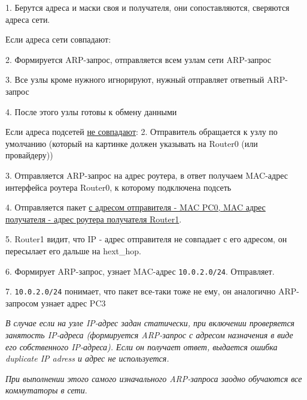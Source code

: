 \documentclass[a4paper,10pt]{article}
\begin{document}
	1. Берутся адреса и маски своя и получателя, они сопоставляются, сверяются адреса сети.
	
	Если адреса сети совпадают:
	
	2. Формируется ARP-запрос, отправляется всем узлам сети ARP-запрос
	
	3. Все узлы кроме нужного игнорируют, нужный отправляет ответный ARP-запрос
	
	4. После этого узлы готовы к обмену данными
	
	Если адреса подсетей \underline{не совпадают}:
	2. Отправитель обращается к узлу по умолчанию (который на картинке должен указывать на Router0 (или провайдеру))
	
	3. Отправляется ARP-запрос на адрес роутера, в ответ получаем MAC-адрес интерфейса роутера Router0, к которому подключена подсеть
	
	4. Отправляется пакет \underline{с адресом отправителя - MAC PC0, MAC адрес получателя - адрес роутера получателя Router1}.
	
	5. Router1 видит, что IP - адрес отправителя не совпадает с его адресом, он пересылает его дальше на hext\_hop.
	
	6. Формирует ARP-запрос, узнает MAC-адрес \texttt{10.0.2.0/24}. Отправляет.
	
	7. \texttt{10.0.2.0/24} понимает, что пакет все-таки тоже не ему, он аналогично ARP-запросом узнает адрес PC3
	
	\textit{В случае если на узле IP-адрес задан статически, при включении проверяется занятость IP-адреса (формируется ARP-запрос с адресом назначения в виде его собственного IP-адреса). Если он получает ответ, выдается ошибка duplicate IP adress и адрес не используется.}
	
	\textit{При выполнении этого самого изначального ARP-запроса заодно обучаются все коммутаторы в сети}.
\end{document}
